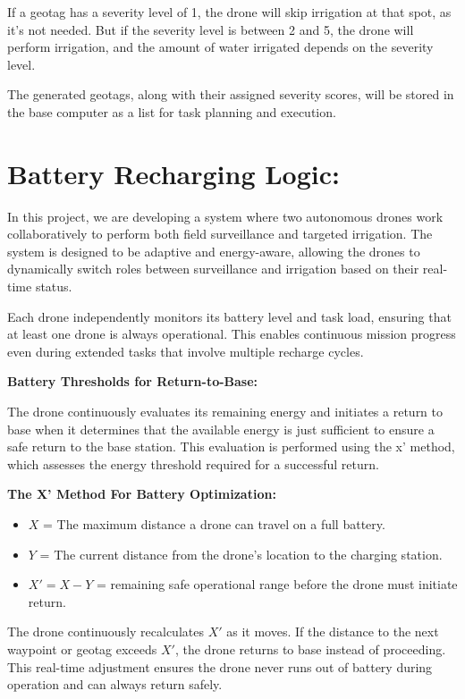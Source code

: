 \documentclass[12pt]{article}
\begin{document}
If a geotag has a severity level of 1, the drone will skip irrigation at that spot, as it's not needed. But if the severity level is between 2 and 5, the drone will perform irrigation, and the amount of water irrigated depends on the severity level.

The generated geotags, along with their assigned severity scores, will be stored in the base computer as a list for task planning and execution.

\section*{Battery Recharging Logic:}
In this project, we are developing a system where two autonomous drones work collaboratively to perform both field surveillance and targeted irrigation. The system is designed to be adaptive and energy-aware, allowing the drones to dynamically switch roles between surveillance and irrigation based on their real-time status.

Each drone independently monitors its battery level and task load, ensuring that at least one drone is always operational. This enables continuous mission progress even during extended tasks that involve multiple recharge cycles.

\textbf{Battery Thresholds for Return-to-Base:}

The drone continuously evaluates its remaining energy and initiates a return to base when it determines that the available energy is just sufficient to ensure a safe return to the base station. This evaluation is performed using the x' method, which assesses the energy threshold required for a successful return.

\textbf{The X’ Method For Battery Optimization:}

\begin{itemize}
  \item $X$ = The maximum distance a drone can travel on a full battery.
  \item $Y$ = The current distance from the drone’s location to the charging station.
  \item $X' = X - Y$ = remaining safe operational range before the drone must initiate return.
\end{itemize}

The drone continuously recalculates $X'$ as it moves. If the distance to the next waypoint or geotag exceeds $X'$, the drone returns to base instead of proceeding. This real-time adjustment ensures the drone never runs out of battery during operation and can always return safely.
\end{document}
